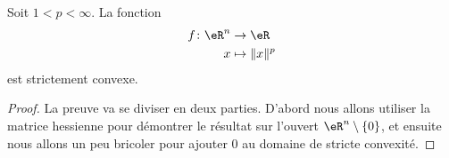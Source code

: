 \begin{proposition}     \label{PROPooLIGIooPrHYlb}
	Soit \( 1<p<\infty\). La fonction
	\begin{equation}
		\begin{aligned}
			f\colon \eR^n & \to \eR           \\
			x             & \mapsto \| x \|^p
		\end{aligned}
	\end{equation}
	est strictement convexe.
\end{proposition}

\begin{proof}
	La preuve va se diviser en deux parties. D'abord nous allons utiliser la matrice hessienne pour démontrer le résultat sur l'ouvert \( \eR^n\setminus\{ 0 \}\), et ensuite nous allons un peu bricoler pour ajouter \( 0\) au domaine de stricte convexité.


\end{proof}
